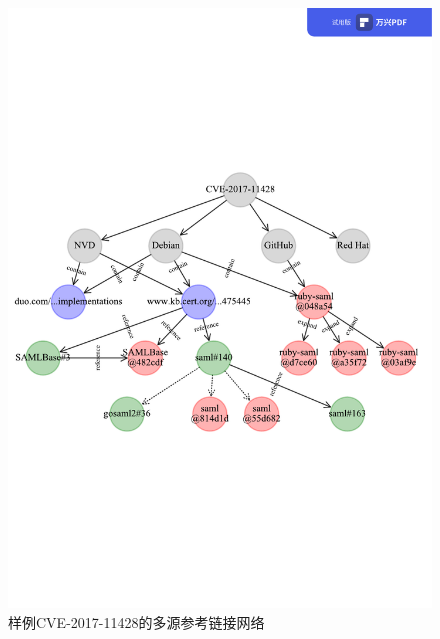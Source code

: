 \begin{figure}[h]
    \centering
    \includegraphics[scale=0.68]{fig/network-example.pdf}
    \caption{样例CVE-2017-11428的多源参考链接网络}\label{fig:example}
\end{figure}

